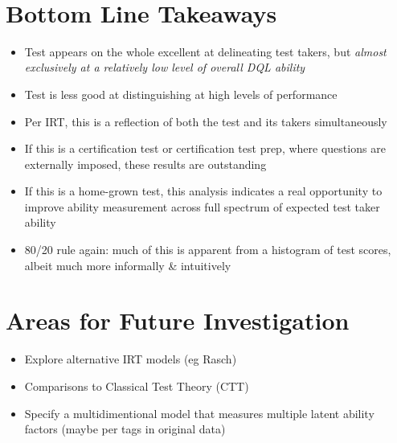 \documentclass[11pt]{article}
\providecommand{\tightlist}{%
      \setlength{\itemsep}{0pt}\setlength{\parskip}{0pt}}
\begin{document}
    \begin{center}
    \end{center}
    { \hspace*{\fill} \\}
    
    \section{Bottom Line Takeaways}\label{bottom-line-takeaways}

\begin{itemize}
\tightlist
\item
  Test appears on the whole excellent at delineating test takers, but
  \emph{almost exclusively at a relatively low level of overall DQL
  ability}
\item
  Test is less good at distinguishing at high levels of performance
\item
  Per IRT, this is a reflection of both the test and its takers
  simultaneously
\item
  If this is a certification test or certification test prep, where
  questions are externally imposed, these results are outstanding
\item
  If this is a home-grown test, this analysis indicates a real
  opportunity to improve ability measurement across full spectrum of
  expected test taker ability
\item
  80/20 rule again: much of this is apparent from a histogram of test
  scores, albeit much more informally \& intuitively
\end{itemize}

    \section{Areas for Future
Investigation}\label{areas-for-future-investigation}

\begin{itemize}
\tightlist
\item
  Explore alternative IRT models (eg Rasch)
\item
  Comparisons to Classical Test Theory (CTT)
\item
  Specify a multidimentional model that measures multiple latent ability
  factors (maybe per tags in original data)
\end{itemize}


    
    
    
\end{document}
